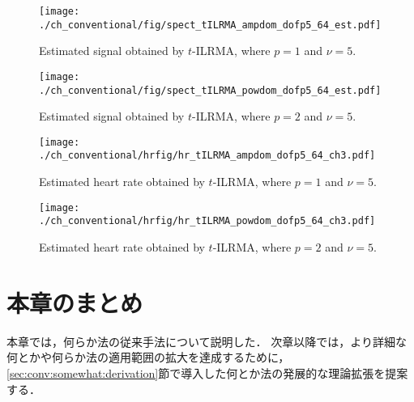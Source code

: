 \begin{figure}[tb]
\centering
\texttt{[image: ./ch\_conventional/fig/spect\_tILRMA\_ampdom\_dofp5\_64\_est.pdf]}
\caption{Estimated signal obtained by $t$-ILRMA, where $p=1$ and $\nu=5$.}
\label{fig:stilrmaa5}
\end{figure}

\begin{figure}[tb]
\centering
\texttt{[image: ./ch\_conventional/fig/spect\_tILRMA\_powdom\_dofp5\_64\_est.pdf]}
\caption{Estimated signal obtained by $t$-ILRMA, where $p=2$ and $\nu=5$.}
\label{fig:stilrmap5}
\end{figure}

\begin{figure}[tb]
\centering
\texttt{[image: ./ch\_conventional/hrfig/hr\_tILRMA\_ampdom\_dofp5\_64\_ch3.pdf]}
\caption{Estimated heart rate obtained by $t$-ILRMA, where $p=1$ and $\nu=5$.}
\label{fig:hrtilrmaa5}
\end{figure}

\begin{figure}[tb]
\centering
\texttt{[image: ./ch\_conventional/hrfig/hr\_tILRMA\_powdom\_dofp5\_64\_ch3.pdf]}
\caption{Estimated heart rate obtained by $t$-ILRMA, where $p=2$ and $\nu=5$.}
\label{fig:hrtilrmap5}
\end{figure}

\section{本章のまとめ}
本章では，何らか法の従来手法について説明した．
次章以降では，より詳細な何とかや何らか法の適用範囲の拡大を達成するために，
\ref{sec:conv:somewhat:derivation}節で導入した何とか法の発展的な理論拡張を提案する．
